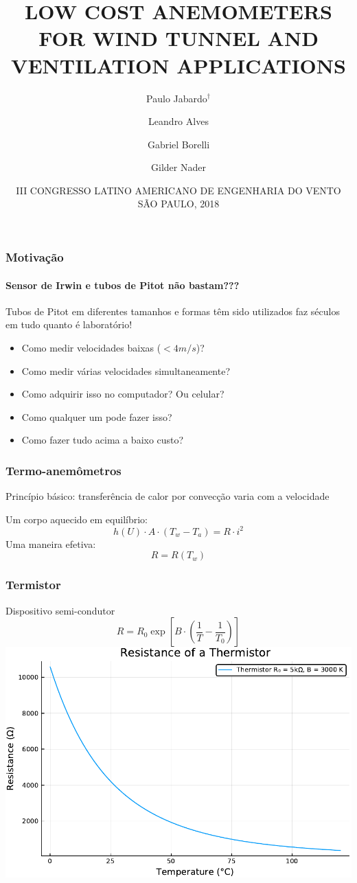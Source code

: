 \documentclass[12pt,handout]{beamer}
\title[LOW COST ANEMOMETERS]{LOW COST ANEMOMETERS FOR WIND TUNNEL AND VENTILATION APPLICATIONS}
\author{Paulo Jabardo\inst{a}$^\dagger$ \and Leandro Alves\inst{a} \and Gabriel Borelli\inst{a} \and Gilder Nader} %
\institute{
	\inst{a}
	Institute for Technological Research, São Paulo, Brazil 
}
\date{\scriptsize{\textcolor{BaseColor}{III CONGRESSO LATINO AMERICANO DE ENGENHARIA DO VENTO \\ \vspace{0.3cm} SÃO PAULO, 2018}}}
\begin{document}

\begin{frame}
	\titlepage
\end{frame}


\begin{frame}
	\frametitle{Motivação}
	\framesubtitle{Sensor de Irwin e tubos de Pitot não bastam???}
	
        Tubos de Pitot em diferentes tamanhos e formas têm sido utilizados faz séculos em tudo quanto é laboratório! 
	
	\begin{itemize}
		\item Como medir velocidades baixas ($< 4 m/s$)?
		\item Como medir várias velocidades simultaneamente?
		\item Como adquirir isso no computador? Ou celular?
                \item Como qualquer um pode fazer isso?
                \item Como fazer tudo acima a baixo custo?
	\end{itemize}
\end{frame}

\begin{frame}
  \frametitle{Termo-anemômetros}

  Princípio básico: transferência de calor por convecção varia com a velocidade

  Um corpo aquecido em equilíbrio:
  \[
  h(U)\cdot A \cdot(T_w - T_a) = R\cdot i^2
  \]
  Uma maneira efetiva:
  \[
  R = R(T_w)
  \]
  
\end{frame}

\begin{frame}
  \frametitle{Termistor}
  Dispositivo semi-condutor
  \[
  R = R_0\exp\left[ B \cdot \left(\frac{1}{T} - \frac{1}{T_0} \right) \right]
  \]
  \centering
  \includegraphics[height=0.7\textheight]{../../figures/thermistor.pdf}
  
\end{frame}
\end{document}
